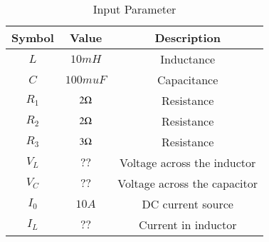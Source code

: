 \begin{table}[!ht]
\renewcommand\thetable{1}
   \centering
\begin{tabular}{|c|c|c|}
  \hline
  \textbf{Symbol} & \textbf{Value} & \textbf{Description}\\
  \hline
  $L$ &  $10mH$ & Inductance\\
  \hline 
  $C$ &  $100mu F$ & Capacitance \\
  \hline
  $R_1$ &  $2\ohm$ & Resistance\\
  \hline
  $R_2$ & $2\ohm$ & Resistance\\
  \hline
    $R_3$ & $3\ohm$ & Resistance\\
  \hline
  $V_L$ & $??$ & Voltage across the inductor\\
  \hline
    $V_C$ & $??$ & Voltage across the capacitor\\
  \hline
  $I_0$ & $10 A$ & DC current source\\
  \hline
  $I_L$ & $??$ & Current in inductor\\
    \hline
\end{tabular}
\caption{Input Parameter}
\end{table}
